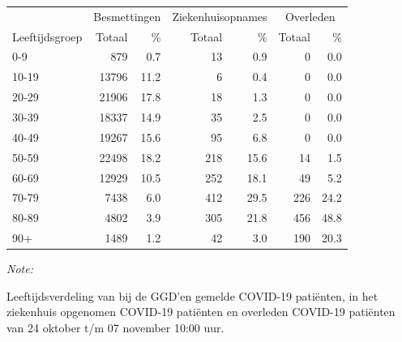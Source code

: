 \documentclass[
  english,
  man,floatsintext]{apa6}
\begin{document}
\begin{table}[H]
\centering\begingroup\fontsize{11}{13}\selectfont

\begin{threeparttable}
\begin{tabular}{lrrrrrr}
\toprule
\multicolumn{1}{c}{ } & \multicolumn{2}{c}{Besmettingen} & \multicolumn{2}{c}{Ziekenhuisopnames} & \multicolumn{2}{c}{Overleden} \\
\cmidrule(l{3pt}r{3pt}){2-3} \cmidrule(l{3pt}r{3pt}){4-5} \cmidrule(l{3pt}r{3pt}){6-7}
Leeftijdsgroep & Totaal & \% & Totaal & \% & Totaal & \%\\
\midrule
0-9 & 879 & 0.7 & 13 & 0.9 & 0 & 0.0\\
10-19 & 13796 & 11.2 & 6 & 0.4 & 0 & 0.0\\
20-29 & 21906 & 17.8 & 18 & 1.3 & 0 & 0.0\\
30-39 & 18337 & 14.9 & 35 & 2.5 & 0 & 0.0\\
40-49 & 19267 & 15.6 & 95 & 6.8 & 0 & 0.0\\
50-59 & 22498 & 18.2 & 218 & 15.6 & 14 & 1.5\\
60-69 & 12929 & 10.5 & 252 & 18.1 & 49 & 5.2\\
70-79 & 7438 & 6.0 & 412 & 29.5 & 226 & 24.2\\
80-89 & 4802 & 3.9 & 305 & 21.8 & 456 & 48.8\\
90+ & 1489 & 1.2 & 42 & 3.0 & 190 & 20.3\\
\bottomrule
\end{tabular}
\begin{tablenotes}
\item \textit{Note: } 
\item Leeftijdsverdeling van bij de GGD’en gemelde COVID-19 patiënten, in het ziekenhuis opgenomen COVID-19 patiënten en overleden COVID-19 patiënten van 24 oktober t/m 07 november 10:00 uur.
\end{tablenotes}
\end{threeparttable}
\endgroup{}
\end{table}
\end{document}
